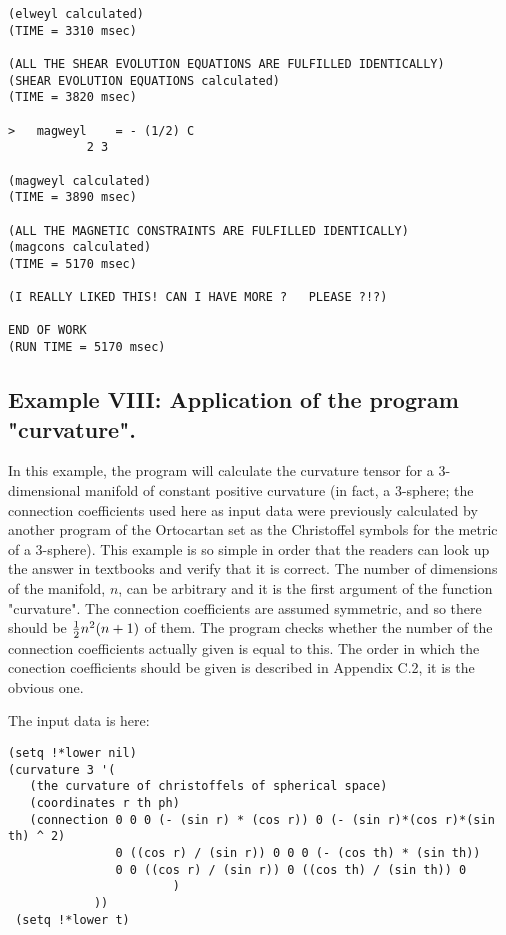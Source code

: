 \begin{verbatim}
(elweyl calculated)
(TIME = 3310 msec)

(ALL THE SHEAR EVOLUTION EQUATIONS ARE FULFILLED IDENTICALLY)
(SHEAR EVOLUTION EQUATIONS calculated)
(TIME = 3820 msec)

>   magweyl    = - (1/2) C
           2 3

(magweyl calculated)
(TIME = 3890 msec)

(ALL THE MAGNETIC CONSTRAINTS ARE FULFILLED IDENTICALLY)
(magcons calculated)
(TIME = 5170 msec)

(I REALLY LIKED THIS! CAN I HAVE MORE ?   PLEASE ?!?)

END OF WORK
(RUN TIME = 5170 msec)
\end{verbatim}

\bigskip

\subsection{Example VIII: Application of the program "curvature".}

In this example, the program will calculate the curvature tensor for a
3-dimensional manifold of constant positive curvature (in fact, a 3-sphere; the
connection coefficients used here as input data were previously calculated by
another program of the Ortocartan set as the Christoffel symbols for the metric
of a 3-sphere). This example is so simple in order that the readers can look up
the answer in textbooks and verify that it is correct. The number of dimensions
of the manifold, $n$, can be arbitrary and it is the first argument of the
function "curvature". The connection coefficients are assumed symmetric, and so
there should be ${1 \over 2}n^2(n + 1)$ of them. The program checks whether the
number of the connection coefficients actually given is equal to this. The
order in which the conection coefficients should be given is described in
Appendix C.2, it is the obvious one.

The input data is here:

\bigskip

\begin{verbatim}
(setq !*lower nil)
(curvature 3 '(
   (the curvature of christoffels of spherical space)
   (coordinates r th ph)
   (connection 0 0 0 (- (sin r) * (cos r)) 0 (- (sin r)*(cos r)*(sin th) ^ 2)
               0 ((cos r) / (sin r)) 0 0 0 (- (cos th) * (sin th))
               0 0 ((cos r) / (sin r)) 0 ((cos th) / (sin th)) 0
                       )
            ))
 (setq !*lower t)
\end{verbatim}

